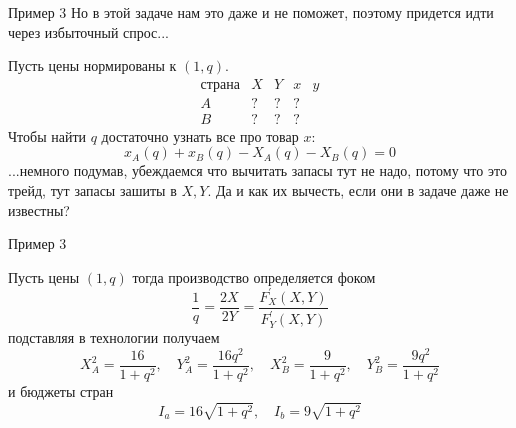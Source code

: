 \documentclass{beamer}
\begin{document}
\begin{frame}{Пример 3}
Но в этой задаче нам это даже и не поможет, поэтому придется идти через избыточный спрос...

Пусть цены нормированы к $(1,q)$.
$$\begin{array}{c|c|c|c|c}
  \text{страна} & X & Y & x & y \\
  \hline
  A & ? & ? & ? &\\
  \hline
  B & ? & ? & ? &
\end{array}$$
Чтобы найти $q$ достаточно узнать все про товар $x$:
$$ x_A(q) + x_B(q) - X_A(q) - X_B(q) = 0$$
...немного подумав, убеждаемся что \alert{вычитать запасы тут не надо, потому что это трейд, тут запасы зашиты в $X,Y$}. Да и как их вычесть, если они в задаче даже не известны?
\end{frame}

\begin{frame}{Пример 3}

Пусть цены $(1,q)$ тогда производство определяется фоком
$$ \frac{1}{q} = \frac{2X}{2Y} = \frac{F^{'}_X(X,Y)}{F^{'}_Y(X,Y)}$$
подставляя в технологии получаем
$$X_A^2 = \frac{16}{1+q^2}, \quad Y_A^2 = \frac{16 q^2}{1+q^2}, \quad X_B^2 = \frac{9}{1+q^2}, \quad Y_B^2 = \frac{9 q^2}{1+q^2} $$
и бюджеты стран
$$ I_a = 16 \sqrt{1+q^2}, \quad I_b = 9 \sqrt{1+q^2}$$
\end{frame}
\end{document}
